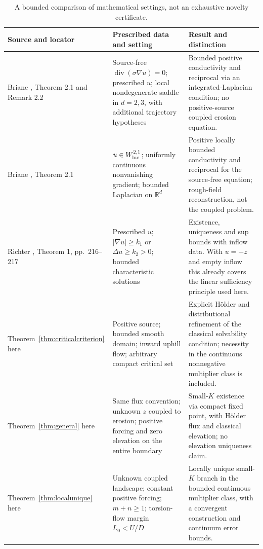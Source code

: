 \documentclass[11pt,a4paper]{article}
\theoremstyle{definition}\newtheorem{definition}[theorem]{Definition}
\theoremstyle{remark}\newtheorem{remark}[theorem]{Remark}
\newcommand{\R}{\mathbb R}\newcommand{\divg}{\operatorname{div}}
\begin{document}
\begin{table}[ht]
\centering\small
\begin{tabular}{p{.22\linewidth}p{.33\linewidth}p{.35\linewidth}}
\toprule
Source and locator & Prescribed data and setting & Result and distinction\\
\midrule
Briane \cite{Briane2014}, Theorem 2.1 and Remark 2.2 & Source-free $\divg(\sigma\nabla u)=0$; prescribed $u$; local nondegenerate saddle in $d=2,3$, with additional trajectory hypotheses & Bounded positive conductivity and reciprocal via an integrated-Laplacian condition; no positive-source coupled erosion equation.\\[3pt]
Briane \cite{Briane2018}, Theorem 2.1 & $u\in W^{2,1}_{\rm loc}$; uniformly continuous nonvanishing gradient; bounded Laplacian on $\R^d$ & Positive locally bounded conductivity and reciprocal for the source-free equation; rough-field reconstruction, not the coupled problem.\\[3pt]
Richter \cite{Richter1981}, Theorem 1, pp.~216--217 & Prescribed $u$; $|\nabla u|\geq k_1$ or $\Delta u\geq k_2>0$; bounded characteristic solutions & Existence, uniqueness and sup bounds with inflow data. With $u=-z$ and empty inflow this already covers the linear sufficiency principle used here.\\[3pt]
Theorem~\ref{thm:criticalcriterion} here & Positive source; bounded smooth domain; inward uphill flow; arbitrary compact critical set & Explicit H\"older and distributional refinement of the classical solvability condition; necessity in the continuous nonnegative multiplier class is included.\\[3pt]
Theorem~\ref{thm:general} here & Same flux convention; unknown $z$ coupled to erosion; positive forcing and zero elevation on the entire boundary & Small-$K$ existence via compact fixed point, with H\"older flux and classical elevation; no elevation uniqueness claim.\\[3pt]
Theorem~\ref{thm:localunique} here & Unknown coupled landscape; constant positive forcing; $m+n\geq1$; torsion-flow margin $L_0<U/D$ & Locally unique small-$K$ branch in the bounded continuous multiplier class, with a convergent construction and continuum error bounds.\\
\bottomrule
\end{tabular}
\caption{A bounded comparison of mathematical settings, not an exhaustive novelty certificate.}\label{tab:prior}
\end{table}
\end{document}
